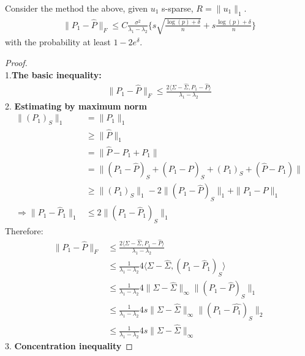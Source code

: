 \begin{theorem}
	Consider the method the above, given $u_1$ s-sparse, $R = \|u_1\|_1$.
	\begin{align*}
		\|P_1 - \hat{P}\|_F \le C \frac{\sigma^2}{\lambda_1 - \lambda_2}\bigg\{s \sqrt{{\frac{\log(p) + \delta}{n}}} + s \frac{\log(p) + \delta}{n} \bigg\} 
	\end{align*}
	with the probability at least $1 - 2e^\delta$.
\end{theorem}
\begin{proof}\quad\\
	1.\textbf{The basic inequality:}
	\begin{align*}
		\|P_1 - \hat{P}\|_F \le \frac{2\langle \Sigma - \hat{\Sigma}, P_1 - \hat{P}\rangle}{\lambda_1 - \lambda_2}
	\end{align*} 
	2. \textbf{Estimating by maximum norm}
	\begin{align*}
		\|(P_1)_S\|_1 &= \|P_1\|_1 \\
		&\ge \|\hat{P}\|_1\\
		&= \|\hat{P} - P_1 + P_1\|\\
		&= \| (P_1 - \hat{P})_S + (P_1 - \hat{P})_S + (P_1)_S + (\hat{P} - P_1)\|\\
		&\ge \|(P_1)_S\|_1 - 2\|(P_1 - \hat{P})_S\|_1 + \|P_1 - \hat{P}\|_1  \\
		\Rightarrow
		\|P_1 - \hat{P}_1\|_1 &\le 2 \|(P_1 - \hat{P}_1)_S\|_1
	\end{align*}
	Therefore:
	\begin{align*}
		\|P_1 - \hat{P}\|_F &\le \frac{2\langle \Sigma - \hat{\Sigma}, P_1 - \hat{P}\rangle}{\lambda_1 - \lambda_2}\\
		&\le \frac{1}{\lambda_1 - \lambda_2} 4\langle \Sigma- \hat{\Sigma}, (P_1 - \hat{P}_1)_S\rangle\\
		&\le \frac{1}{\lambda_1 - \lambda_2} 4 \|\Sigma - \hat{\Sigma}\|_\infty \|(P_1 - \hat{P})_S\|_1  \\
		&\le \frac{1}{\lambda_1 - \lambda_2} 4s \|\Sigma - \hat{\Sigma}\|_\infty \|(P_1 - \hat{P_1})_S\|_2\\
		&\le \frac{1}{\lambda_1 - \lambda_2} 4s \|\Sigma - \hat{\Sigma}\|_\infty		
	\end{align*}
	3. \textbf{Concentration inequality }
\end{proof}




\newpage
